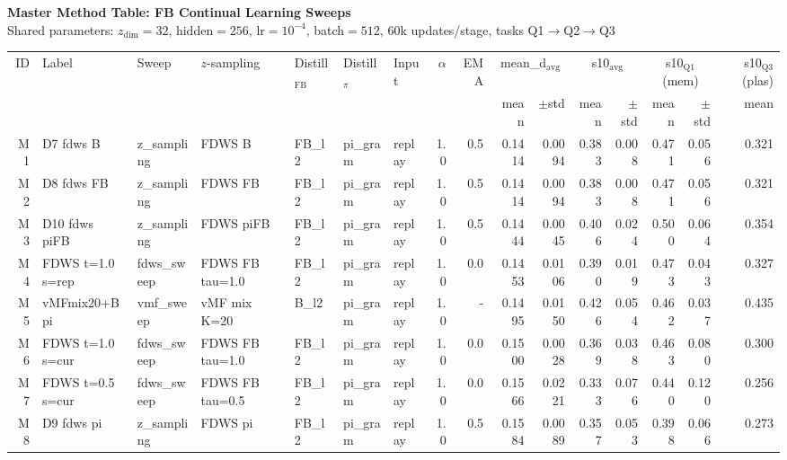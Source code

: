 \documentclass[10pt,landscape]{article}
\begin{document}
\pagestyle{empty}

\begin{center}
{\Large\bfseries Master Method Table: FB Continual Learning Sweeps}\\[4pt]
{\small Shared parameters: $z_\text{dim}=32$, hidden$=256$, lr$=10^{-4}$, batch$=512$, 60k updates/stage, tasks Q1$\to$Q2$\to$Q3}
\end{center}

\vspace{4pt}
\begin{adjustbox}{max width=\textwidth}
\begin{tabular}{rl l l l l l r r rr rr rr r}
\toprule
ID & Label & Sweep & $z$-sampling & Distill$_\text{FB}$ & Distill$_\pi$ & Input & $\alpha$ & EMA & \multicolumn{2}{c}{mean\_d$_\text{avg}$} & \multicolumn{2}{c}{s10$_\text{avg}$} & \multicolumn{2}{c}{s10$_\text{Q1}$ (mem)} & s10$_\text{Q3}$ (plas) \\
 & & & & & & & & & mean & $\pm$std & mean & $\pm$std & mean & $\pm$std & mean \\
\midrule
\rowcolor{bestrow}
M1 & D7 fdws B & z\_sampling & FDWS B & FB\_l2 & pi\_gram & replay & 1.0 & 0.5 & 0.1414 & 0.0094 & 0.383 & 0.008 & 0.471 & 0.056 & 0.321 \\
M2 & D8 fdws FB & z\_sampling & FDWS FB & FB\_l2 & pi\_gram & replay & 1.0 & 0.5 & 0.1414 & 0.0094 & 0.383 & 0.008 & 0.471 & 0.056 & 0.321 \\
M3 & D10 fdws piFB & z\_sampling & FDWS piFB & FB\_l2 & pi\_gram & replay & 1.0 & 0.5 & 0.1444 & 0.0045 & 0.406 & 0.024 & 0.500 & 0.064 & 0.354 \\
M4 & FDWS t=1.0 s=rep & fdws\_sweep & FDWS FB tau=1.0 & FB\_l2 & pi\_gram & replay & 1.0 & 0.0 & 0.1453 & 0.0106 & 0.390 & 0.019 & 0.473 & 0.043 & 0.327 \\
M5 & vMFmix20+Bpi & vmf\_sweep & vMF mix K=20 & B\_l2 & pi\_gram & replay & 1.0 & - & 0.1495 & 0.0150 & 0.426 & 0.054 & 0.462 & 0.037 & 0.435 \\
M6 & FDWS t=1.0 s=cur & fdws\_sweep & FDWS FB tau=1.0 & FB\_l2 & pi\_gram & replay & 1.0 & 0.0 & 0.1500 & 0.0028 & 0.369 & 0.038 & 0.463 & 0.080 & 0.300 \\
M7 & FDWS t=0.5 s=cur & fdws\_sweep & FDWS FB tau=0.5 & FB\_l2 & pi\_gram & replay & 1.0 & 0.0 & 0.1566 & 0.0221 & 0.333 & 0.076 & 0.440 & 0.120 & 0.256 \\
M8 & D9 fdws pi & z\_sampling & FDWS pi & FB\_l2 & pi\_gram & replay & 1.0 & 0.5 & 0.1584 & 0.0089 & 0.357 & 0.053 & 0.398 & 0.066 & 0.273 \\

\end{tabular}
\end{adjustbox}
\end{document}
